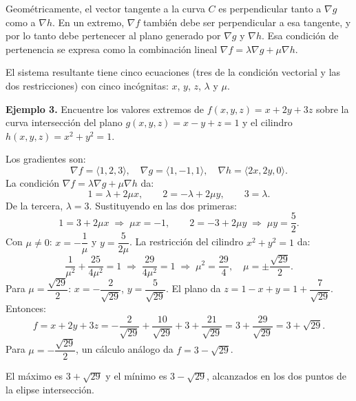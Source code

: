 Geométricamente, el vector tangente a la curva $C$ es perpendicular tanto a $\nabla g$ como a $\nabla h$. En un extremo, $\nabla f$ también debe ser perpendicular a esa tangente, y por lo tanto debe pertenecer al plano generado por $\nabla g$ y $\nabla h$. Esa condición de pertenencia se expresa como la combinación lineal $\nabla f = \lambda \nabla g + \mu \nabla h$.

El sistema resultante tiene cinco ecuaciones (tres de la condición vectorial y las dos restricciones) con cinco incógnitas: $x$, $y$, $z$, $\lambda$ y $\mu$.

\textbf{Ejemplo 3.} Encuentre los valores extremos de $f(x, y, z) = x + 2y + 3z$ sobre la curva intersección del plano $g(x, y, z) = x - y + z = 1$ y el cilindro $h(x, y, z) = x^2 + y^2 = 1$.

Los gradientes son:
\[
\nabla f = \langle 1, 2, 3 \rangle, \quad \nabla g = \langle 1, -1, 1 \rangle, \quad \nabla h = \langle 2x, 2y, 0 \rangle.
\]
La condición $\nabla f = \lambda \nabla g + \mu \nabla h$ da:
\[
1 = \lambda + 2\mu x, \qquad 2 = -\lambda + 2\mu y, \qquad 3 = \lambda.
\]
De la tercera, $\lambda = 3$. Sustituyendo en las dos primeras:
\[
1 = 3 + 2\mu x \;\Rightarrow\; \mu x = -1, \qquad 2 = -3 + 2\mu y \;\Rightarrow\; \mu y = \frac{5}{2}.
\]
Con $\mu \neq 0$: $x = -\dfrac{1}{\mu}$ y $y = \dfrac{5}{2\mu}$. La restricción del cilindro $x^2 + y^2 = 1$ da:
\[
\frac{1}{\mu^2} + \frac{25}{4\mu^2} = 1 \;\Rightarrow\; \frac{29}{4\mu^2} = 1 \;\Rightarrow\; \mu^2 = \frac{29}{4}, \quad \mu = \pm\frac{\sqrt{29}}{2}.
\]
Para $\mu = \dfrac{\sqrt{29}}{2}$: $x = -\dfrac{2}{\sqrt{29}}$, $y = \dfrac{5}{\sqrt{29}}$. El plano da $z = 1 - x + y = 1 + \dfrac{7}{\sqrt{29}}$. Entonces:
\[
f = x + 2y + 3z = -\frac{2}{\sqrt{29}} + \frac{10}{\sqrt{29}} + 3 + \frac{21}{\sqrt{29}} = 3 + \frac{29}{\sqrt{29}} = 3 + \sqrt{29}.
\]
Para $\mu = -\dfrac{\sqrt{29}}{2}$, un cálculo análogo da $f = 3 - \sqrt{29}$.

El máximo es $3 + \sqrt{29}$ y el mínimo es $3 - \sqrt{29}$, alcanzados en los dos puntos de la elipse intersección.

